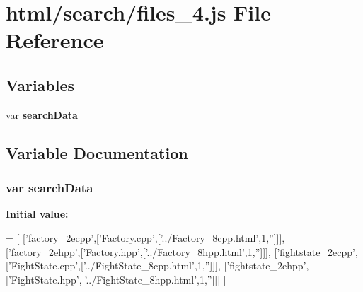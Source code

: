 \section{html/search/files\-\_\-4.js File Reference}
\label{files__4_8js}
\subsection*{Variables}
\begin{DoxyCompactItemize}
\item 
var {\bf search\-Data}
\end{DoxyCompactItemize}


\subsection{Variable Documentation}
\subsubsection[{search\-Data}]{\setlength{\rightskip}{0pt plus 5cm}var search\-Data}\label{files__4_8js_ad01a7523f103d6242ef9b0451861231e}
{\bfseries Initial value\-:}
\begin{DoxyCode}
=
[
  [\textcolor{stringliteral}{'factory\_2ecpp'},[\textcolor{stringliteral}{'Factory.cpp'},[\textcolor{stringliteral}{'../Factory\_8cpp.html'},1,\textcolor{stringliteral}{''}]]],
  [\textcolor{stringliteral}{'factory\_2ehpp'},[\textcolor{stringliteral}{'Factory.hpp'},[\textcolor{stringliteral}{'../Factory\_8hpp.html'},1,\textcolor{stringliteral}{''}]]],
  [\textcolor{stringliteral}{'fightstate\_2ecpp'},[\textcolor{stringliteral}{'FightState.cpp'},[\textcolor{stringliteral}{'../FightState\_8cpp.html'},1,\textcolor{stringliteral}{''}]]],
  [\textcolor{stringliteral}{'fightstate\_2ehpp'},[\textcolor{stringliteral}{'FightState.hpp'},[\textcolor{stringliteral}{'../FightState\_8hpp.html'},1,\textcolor{stringliteral}{''}]]]
]
\end{DoxyCode}
